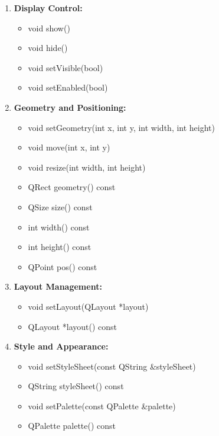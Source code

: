 \documentclass{report}
\begin{document}
    \pagebreak 
    \bigbreak \noindent 
    \begin{enumerate}
         \item \textbf{Display Control:}
        \begin{itemize}
            \item void show()
            \item void hide()
            \item void setVisible(bool)
            \item void setEnabled(bool)
        \end{itemize}

        \item \textbf{Geometry and Positioning:}
        \begin{itemize}
            \item void setGeometry(int x, int y, int width, int height)
            \item void move(int x, int y)
            \item void resize(int width, int height)
            \item QRect geometry() const
            \item QSize size() const
            \item int width() const
            \item int height() const
            \item QPoint pos() const
        \end{itemize}

        \item \textbf{Layout Management:}
        \begin{itemize}
            \item void setLayout(QLayout *layout)
            \item QLayout *layout() const
        \end{itemize}

        \item \textbf{Style and Appearance:}
        \begin{itemize}
            \item void setStyleSheet(const QString \&styleSheet)
            \item QString styleSheet() const
            \item void setPalette(const QPalette \&palette)
            \item QPalette palette() const
        \end{itemize}


\end{enumerate}
\end{document}
